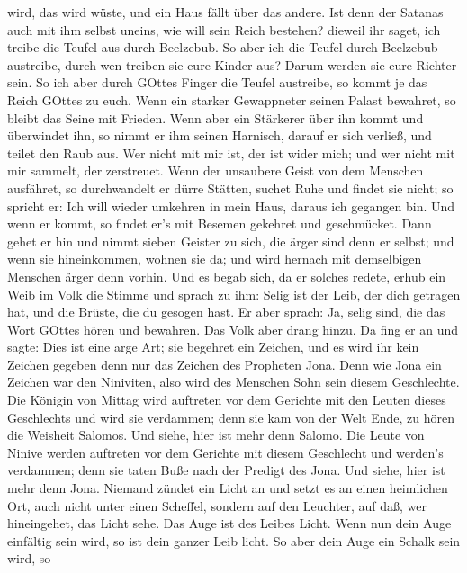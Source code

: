 wird, das wird wüste, und ein Haus fällt über das andere. 
Ist denn der Satanas auch mit ihm selbst uneins, wie will sein Reich
bestehen? dieweil ihr saget, ich treibe die Teufel aus durch Beelzebub.
 So aber ich die Teufel durch Beelzebub austreibe, durch
wen treiben sie eure Kinder aus? Darum werden sie eure Richter sein.
 So ich aber durch GOttes Finger die Teufel austreibe, so
kommt je das Reich GOttes zu euch.  Wenn ein starker
Gewappneter seinen Palast bewahret, so bleibt das Seine mit Frieden.
 Wenn aber ein Stärkerer über ihn kommt und überwindet ihn,
so nimmt er ihm seinen Harnisch, darauf er sich verließ, und teilet den
Raub aus.  Wer nicht mit mir ist, der ist wider mich; und
wer nicht mit mir sammelt, der zerstreuet.  Wenn der
unsaubere Geist von dem Menschen ausfähret, so durchwandelt er dürre
Stätten, suchet Ruhe und findet sie nicht; so spricht er: Ich will
wieder umkehren in mein Haus, daraus ich gegangen bin.  Und
wenn er kommt, so findet er's mit Besemen gekehret und geschmücket.
 Dann gehet er hin und nimmt sieben Geister zu sich, die
ärger sind denn er selbst; und wenn sie hineinkommen, wohnen sie da; und
wird hernach mit demselbigen Menschen ärger denn vorhin. 
Und es begab sich, da er solches redete, erhub ein Weib im Volk die
Stimme und sprach zu ihm: Selig ist der Leib, der dich getragen hat, und
die Brüste, die du gesogen hast.  Er aber sprach: Ja, selig
sind, die das Wort GOttes hören und bewahren.  Das Volk
aber drang hinzu. Da fing er an und sagte: Dies ist eine arge Art; sie
begehret ein Zeichen, und es wird ihr kein Zeichen gegeben denn nur das
Zeichen des Propheten Jona.  Denn wie Jona ein Zeichen war
den Niniviten, also wird des Menschen Sohn sein diesem Geschlechte.
 Die Königin von Mittag wird auftreten vor dem Gerichte mit
den Leuten dieses Geschlechts und wird sie verdammen; denn sie kam von
der Welt Ende, zu hören die Weisheit Salomos. Und siehe, hier ist mehr
denn Salomo.  Die Leute von Ninive werden auftreten vor dem
Gerichte mit diesem Geschlecht und werden's verdammen; denn sie taten
Buße nach der Predigt des Jona. Und siehe, hier ist mehr denn Jona.
 Niemand zündet ein Licht an und setzt es an einen
heimlichen Ort, auch nicht unter einen Scheffel, sondern auf den
Leuchter, auf daß, wer hineingehet, das Licht sehe.  Das
Auge ist des Leibes Licht. Wenn nun dein Auge einfältig sein wird, so
ist dein ganzer Leib licht. So aber dein Auge ein Schalk sein wird, so
